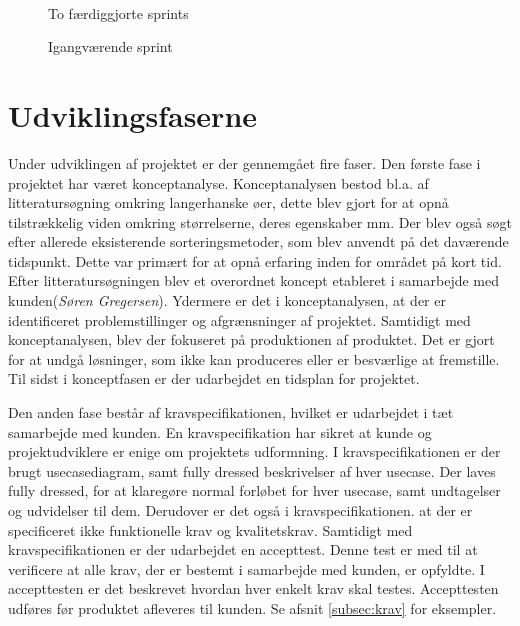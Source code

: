 \begin{figure}[htbp]
\begin{minipage}[b]{0.48\textwidth}
\end{minipage} \\ %
\begin{minipage}[t]{0.48\textwidth}
\caption{To færdiggjorte sprints} %
\label{fig:pt_sprints}
\end{minipage} \hfill
\begin{minipage}[t]{0.48\textwidth}
\caption{Igangværende sprint} %
\label{fig:pt_currentsprint}
\end{minipage}
\end{figure}

\section{Udviklingsfaserne}
Under udviklingen af projektet er der gennemgået fire faser. Den første fase i projektet har været konceptanalyse. Konceptanalysen bestod bl.a. af litteratursøgning omkring langerhanske øer, dette blev gjort for at opnå tilstrækkelig viden omkring størrelserne, deres egenskaber mm. Der blev også søgt efter allerede eksisterende sorteringsmetoder, som blev anvendt på det daværende tidspunkt. Dette var primært for at opnå erfaring inden for området på kort tid. Efter litteratursøgningen blev et overordnet koncept etableret i samarbejde med kunden(\textit{Søren Gregersen}). Ydermere er det i konceptanalysen, at der er identificeret problemstillinger og afgrænsninger af projektet. Samtidigt med konceptanalysen, blev der fokuseret på produktionen af produktet. Det er gjort for at undgå løsninger, som ikke kan produceres eller er besværlige at fremstille. Til sidst i konceptfasen er der udarbejdet en tidsplan for projektet.

Den anden fase består af kravspecifikationen, hvilket er udarbejdet i tæt samarbejde med kunden. En kravspecifikation har sikret at kunde og projektudviklere er enige om projektets udformning. I kravspecifikationen er der brugt usecasediagram, samt fully dressed beskrivelser af hver usecase. Der laves fully dressed, for at klaregøre normal forløbet for hver usecase, samt undtagelser og udvidelser til dem. Derudover er det også i kravspecifikationen. at der er specificeret ikke funktionelle krav og kvalitetskrav. Samtidigt med kravspecifikationen er der udarbejdet en accepttest. Denne test er med til at verificere at alle krav, der er bestemt i samarbejde med kunden, er opfyldte. I accepttesten er det beskrevet hvordan hver enkelt krav skal testes. Accepttesten udføres før produktet afleveres til kunden. Se afsnit \ref{subsec:krav} for eksempler.

